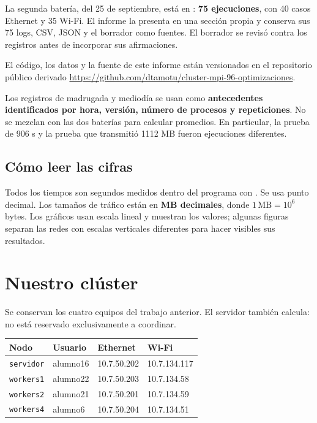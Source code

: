 La segunda batería, del 25 de septiembre, está en : \textbf{75 ejecuciones}, con 40 casos Ethernet y 35 Wi-Fi. El informe la presenta en una sección propia y conserva sus 75 logs, CSV, JSON y el borrador  como fuentes. El borrador se revisó contra los registros antes de incorporar sus afirmaciones.

El código, los datos y la fuente de este informe están versionados en el repositorio público derivado \url{https://github.com/dtamotu/cluster-mpi-96-optimizaciones}.

Los registros de madrugada y mediodía se usan como \textbf{antecedentes identificados por hora, versión, número de procesos y repeticiones}. No se mezclan con las dos baterías para calcular promedios. En particular, la prueba de 906 s y la prueba que transmitió 1112 MB fueron ejecuciones diferentes.

\subsection{Cómo leer las cifras}
Todos los tiempos son segundos medidos dentro del programa con . Se usa punto decimal. Los tamaños de tráfico están en \textbf{MB decimales}, donde $1\,\mathrm{MB}=10^6$ bytes. Los gráficos usan escala lineal y muestran los valores; algunas figuras separan las redes con escalas verticales diferentes para hacer visibles sus resultados.

\clearpage
\section{Nuestro clúster}

Se conservan los cuatro equipos del trabajo anterior. El servidor también calcula: no está reservado exclusivamente a coordinar.

\begin{center}\small
\begin{tabular}{llll}
\toprule
Nodo & Usuario & Ethernet & Wi-Fi \\
\midrule
\texttt{servidor} & alumno16 & 10.7.50.202 & 10.7.134.117 \\
\texttt{workers1} & alumno22 & 10.7.50.203 & 10.7.134.58 \\
\texttt{workers2} & alumno21 & 10.7.50.201 & 10.7.134.59 \\
\texttt{workers4} & alumno6 & 10.7.50.204 & 10.7.134.51 \\
\bottomrule
\end{tabular}\end{center}

